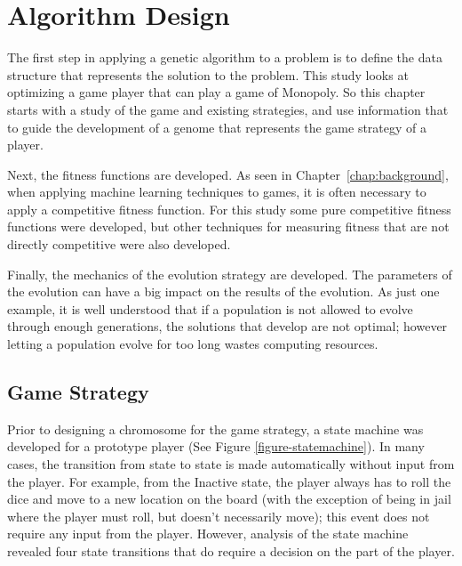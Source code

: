 \clearpage
\chapter{Algorithm Design} \label{chap:algorithm}

The first step in applying a genetic algorithm to a problem is to define the
data structure that represents the solution to the problem. This study looks at
optimizing a game player that can play a game of Monopoly. So this chapter starts with a
study of the game and existing strategies, and use information that to guide the development of
a genome that represents the game strategy of a player.

Next, the fitness functions are developed. As seen in
Chapter~\ref{chap:background}, when applying machine learning techniques to
games, it is often necessary to apply a competitive fitness function. For this
study some pure competitive fitness functions were developed, but 
other techniques for measuring fitness that are not directly competitive were also
developed.

Finally, the mechanics of the evolution strategy are developed. The parameters
of the evolution can have a big impact on the results of the evolution. As just
one example, it is well understood that if a population is not allowed to evolve
through enough generations, the solutions that develop are not optimal; however
letting a population evolve for too long wastes computing resources.  

\section{Game Strategy} \label{5_strategy}

Prior to designing a chromosome for the game strategy, a state machine was
developed for a prototype player (See Figure \ref{figure-statemachine}). In many
cases, the transition from state to state is made automatically without input
from the player. For example, from the Inactive state, the player always has to
roll the dice and move to a new location on the board (with the exception of
being in jail where the player must roll, but doesn't necessarily move); this
event does not require any input from the player. However, analysis of the state
machine revealed four state transitions that do require a decision on the part
of the player.

